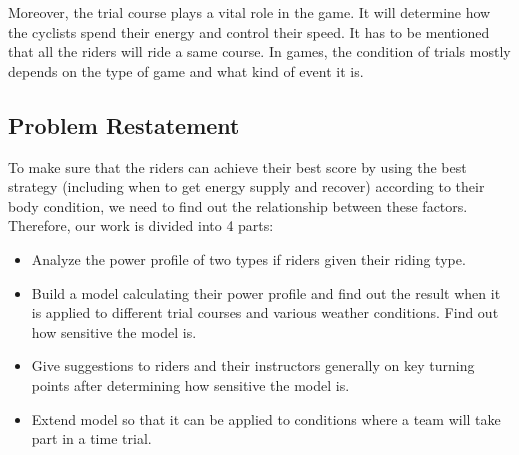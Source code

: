 \documentclass{article}
\begin{document}
		Moreover, the trial course plays a vital role in the game. It will determine how the cyclists spend their energy and control their speed. It has to be mentioned that all the riders will ride a same course. In games, the condition of trials mostly depends on the type of game and what kind of event it is.
		\subsection{Problem Restatement}
		To make sure that the riders can achieve their best score by using the best strategy (including when to get energy supply and recover) according  to their body condition, we need to find out the relationship between these factors. Therefore, our work is divided into 4 parts:
		\begin{itemize}
			\item  Analyze the power profile of two types if riders given their riding type.
			\item  Build a model calculating their power profile and find out the result when it is applied to different trial courses and various weather conditions. Find out how sensitive the model is.
			\item  Give suggestions to riders and their instructors generally on key turning points after determining how sensitive the model is.
			\item  Extend model so that it can be applied to conditions where a team will take part in a time trial.
		\end{itemize}
\end{document}
